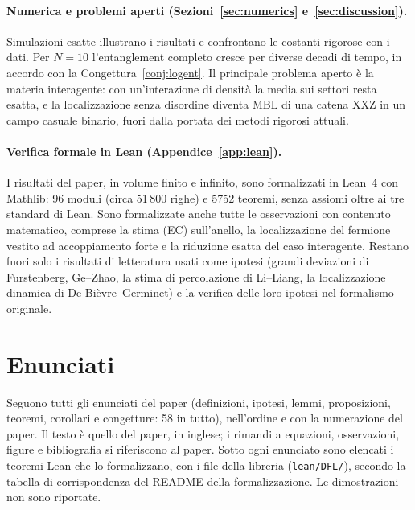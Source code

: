 \documentclass[11pt]{article}
\theoremstyle{stmtplain}
\theoremstyle{stmtdef}
\begin{document}
\paragraph{Numerica e problemi aperti (Sezioni~\ref{sec:numerics} e~\ref{sec:discussion}).}
Simulazioni esatte illustrano i risultati e confrontano le costanti rigorose con i dati. Per $N=10$ l'entanglement
completo cresce per diverse decadi di tempo, in accordo con la Congettura~\ref{conj:logent}. Il principale problema
aperto è la materia interagente: con un'interazione di densità la media sui settori resta esatta, e la
localizzazione senza disordine diventa MBL di una catena XXZ in un campo casuale binario, fuori dalla portata dei
metodi rigorosi attuali.

\paragraph{Verifica formale in Lean (Appendice~\ref{app:lean}).}
I risultati del paper, in volume finito e infinito, sono formalizzati in Lean~4 con Mathlib: 96 moduli (circa
51\,800 righe) e 5752 teoremi, senza assiomi oltre ai tre standard di Lean. Sono formalizzate anche tutte le
osservazioni con contenuto matematico, comprese la stima (EC) sull'anello, la localizzazione del fermione vestito
ad accoppiamento forte e la riduzione esatta del caso interagente. Restano fuori solo i risultati di letteratura usati come ipotesi (grandi deviazioni di
Furstenberg, Ge--Zhao, la stima di percolazione di Li--Liang, la localizzazione dinamica di De Bièvre--Germinet) e
la verifica delle loro ipotesi nel formalismo originale.
\endgroup

\clearpage
\section{Enunciati}\label{sec:enunciati}

\noindent Seguono tutti gli enunciati del paper (definizioni, ipotesi, lemmi, proposizioni, teoremi, corollari e
congetture: 58 in tutto), nell'ordine e con la numerazione del paper. Il testo è quello del paper, in inglese; i
rimandi a equazioni, osservazioni, figure e bibliografia si riferiscono al paper. Sotto ogni enunciato sono elencati
i teoremi Lean che lo formalizzano, con i file della libreria (\texttt{lean/DFL/}), secondo la tabella di
corrispondenza del README della formalizzazione. Le dimostrazioni non sono riportate.


\end{document}
